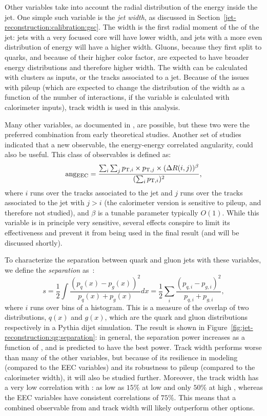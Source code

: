 Other variables take into account the radial distribution of the energy inside the jet. One simple such variable is the \textit{jet width}, as discussed in Section~\ref{jet-reconstruction:calibration:gsc}. The width is the first radial moment of the \pt of the jet: jets with a very focused core will have lower width, and jets with a more even distribution of energy will have a higher width. Gluons, because they first split to quarks, and because of their higher color factor, are expected to have broader energy distributions and therefore higher width. The width can be calculated with clusters as inputs, or the tracks associated to a jet. Because of the issues with pileup (which are expected to change the distribution of the width as a function of the number of interactions, if the variable is calculated with calorimeter inputs), track width is used in this analysis.

Many other variables, as documented in \cite{schwartz1}, are possible, but these two were the preferred combination from early theoretical studies. Another set of studies~\cite{EEC} indicated that a new observable, the energy-energy correlated angularity, could also be useful. This class of observables is defined as:
\begin{equation}
{\rm ang_{\rm EEC}}=\frac{ \sum_i \sum_j p_{{\rm T},i} \times p_{{\rm T},j} \times (\Delta R(i,j))^\beta}{ (\sum_i p_{{\rm T},i})^2 },
\end{equation}
where $i$ runs over the tracks associated to the jet and $j$ runs over the tracks associated to the jet with $j>i$ (the calorimeter version is sensitive to pileup, and therefore not studied), and $\beta$ is a tunable parameter typically $O(1)$. While this variable is in principle very sensitive, several effects conspire to limit its effectiveness and prevent it from being used in the final result (and will be discussed shortly).

To characterize the separation between quark and gluon jets with these variables, we define the \textit{separation} as~\cite{2006physics11219P}:
%
\begin{equation}
s=\frac{1}{2}\int\frac{(p_q(x)-p_g(x))^2}{p_q(x)+p_g(x)}dx = \frac{1}{2}\sum_i\frac{(p_{q,i}-p_{g,i})^2}{p_{q,i}+p_{g,i}}, 
\label{eq:separation}
\end{equation}
%
where $i$ runs over bins of a histogram. This is a measure of the overlap of two distributions, $q(x)$ and $g(x)$, which are the quark and gluon distributions respectively in a Pythia dijet simulation.  The result is shown in Figure~\ref{fig:jet-reconstruction:qg:separation}: in general, the separation power increases as a function of \pt, and \ntrk is predicted to have the best power. Track width performs worse than many of the other variables, but because of its resilience in modeling (compared to the EEC variables) and its robustness to pileup (compared to the calorimeter width), it will also be studied further. Moreover, the track width has a very low correlation with \ntrk: as low as $15\%$ at low \pt and only $50\%$ at high \pt, whereas the EEC variables have consistent correlations of $75\%$. This means that a combined observable from \ntrk and track width will likely outperform other options.

